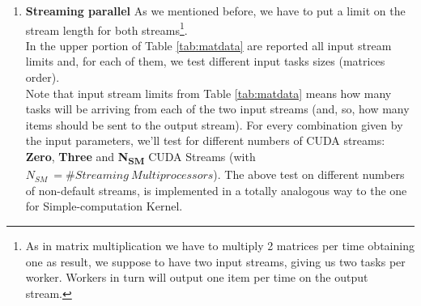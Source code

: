 \begin{enumerate}
	
	
	
	\item \textbf{Streaming parallel}
	As we mentioned before, we have to put a limit on the stream length for both streams\footnote{As in matrix multiplication we have to multiply 2 matrices per time obtaining one as result, we suppose to have two input streams, giving us two tasks per worker. Workers in turn will output one item per time on the output stream.}.\\
	In the upper portion of Table \ref{tab:matdata} are reported all input stream limits and, for each of them, we test different input tasks sizes (matrices order).\\
	Note that input stream limits from Table \ref{tab:matdata} means how many tasks will be arriving from each of the two input streams (and, so, how many items should be sent to the output stream).
	For every combination given by the input parameters, we'll test for different numbers of CUDA streams: \textbf{Zero}, \textbf{Three} and \textbf{N\textsubscript{SM}} CUDA Streams (with \(N_{SM} \ =\# Streaming \ Multiprocessors\)).
	The above test on different numbers of non-default streams, is implemented in a totally analogous way to the one for Simple-computation Kernel.
\end{enumerate}



